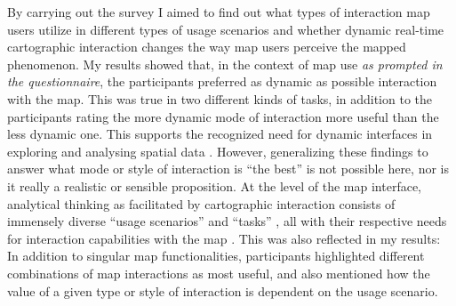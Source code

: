 By carrying out the survey I aimed to find out what types of interaction
map users utilize in different types of usage scenarios
and whether dynamic real-time cartographic interaction changes the way
map users perceive the mapped phenomenon.
My results showed that, in the context of map use \textit{as prompted in the questionnaire},
the participants preferred as dynamic as possible interaction with the map.
This was true in two different kinds of tasks,
in addition to the participants rating the more dynamic mode of interaction
more useful than the less dynamic one.
This supports the recognized need for dynamic interfaces in exploring and analysing
spatial data \parencite{eds2008, but2018}.
However, generalizing these findings to answer what mode or style of interaction is
\enquote{the best} is not possible here,
nor is it really a realistic or sensible proposition.
At the level of the map interface, analytical thinking as facilitated by cartographic interaction
consists of immensely diverse \enquote{usage scenarios} and \enquote{tasks}
\parencite{rob2017b, and2010},
all with their respective needs for interaction capabilities with the map
\parencite{rot2013a, rot2015}.
This was also reflected in my results:
In addition to singular map functionalities,
participants highlighted different combinations of map interactions as most useful,
and also mentioned how the value of a given type or style of interaction is
dependent on the usage scenario.  %


